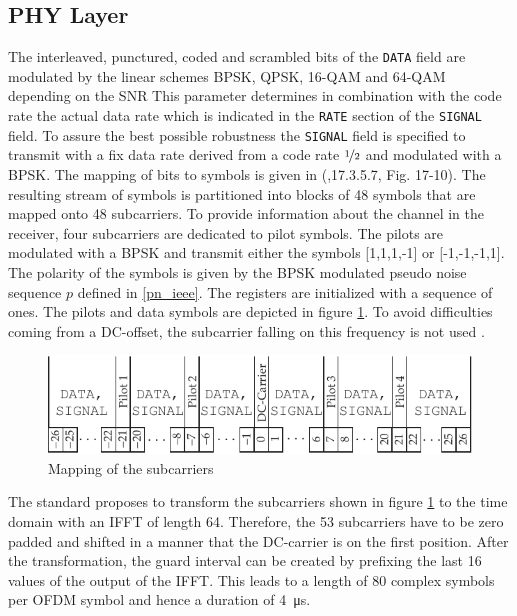 \subsection{PHY Layer}

The interleaved, punctured, coded and scrambled bits of the \texttt{DATA} field are modulated by the linear schemes \ac{BPSK}, \ac{QPSK}, 16-\ac{QAM} and 64-\ac{QAM} depending on the \ac{SNR} This parameter determines in combination with the code rate the actual data rate which is indicated in the \texttt{RATE} section of the \texttt{SIGNAL} field. To assure the best possible robustness the \texttt{SIGNAL} field is specified to transmit with a fix data rate derived from a code rate $\nicefrac{1}{2}$ and modulated with a \ac{BPSK}. The mapping of bits to symbols is given in (\cite{IEEE802.11},17.3.5.7, Fig. 17-10). The resulting stream of symbols is partitioned into blocks of 48 symbols that are mapped onto 48 subcarriers. To provide information about the channel in the receiver, four subcarriers are dedicated to pilot symbols. The pilots are modulated with a \ac{BPSK} and transmit either the symbols [1,1,1,-1] or [-1,-1,-1,1]. The polarity of the symbols is given by the BPSK modulated pseudo noise sequence $p$ defined in \ref{pn_ieee}. The registers are initialized with a sequence of ones. The pilots and data symbols are depicted in figure \ref{fig:OFDM_Sym}. To avoid difficulties coming from a DC-offset, the subcarrier falling on this frequency is not used \cite{IEEE802.11}. 

\begin{figure}[ht]
	\centering
		\includegraphics{../kapitel04/figures/OFDM_Sym.pdf}
	\caption{Mapping of the subcarriers}
	\label{fig:OFDM_Sym}
\end{figure}

The standard proposes to transform the subcarriers shown in figure \ref{fig:OFDM_Sym} to the time domain with an \ac{IFFT} of length 64. Therefore, the 53 subcarriers have to be zero padded and shifted in a manner that the DC-carrier is on the first position. After the transformation, the guard interval can be created by prefixing the last 16 values of the output of the \ac{IFFT}. This leads to a length of 80 complex symbols per OFDM symbol and hence a duration of \SI{4}{\micro s}.




